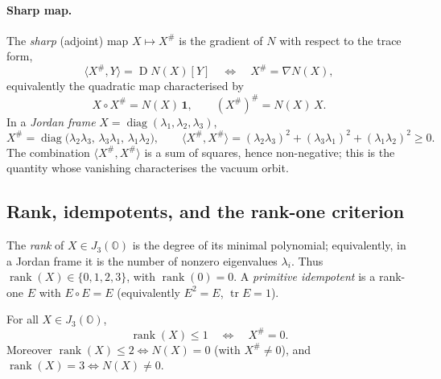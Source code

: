 \paragraph{Sharp map.}
The \emph{sharp} (adjoint) map $X\mapsto X^{\#}$ is the gradient of $N$
with respect to the trace form,
\begin{equation}\label{eq:albert:sharpdef}
  \langle X^{\#}, Y\rangle = \operatorname{D}N(X)[Y]
  \quad\Longleftrightarrow\quad
  X^{\#}=\nabla N(X),
\end{equation}
equivalently the quadratic map characterised by
\begin{equation}\label{eq:albert:sharpid}
  X\circ X^{\#}=N(X)\,\mathbf 1,
  \qquad
  (X^{\#})^{\#}=N(X)\,X .
\end{equation}
In a \emph{Jordan frame} $X=\operatorname{diag}(\lambda_{1},\lambda_{2},\lambda_{3})$,
\begin{equation}\label{eq:albert:sharpframe}
  X^{\#}=\operatorname{diag}\!\bigl(\lambda_{2}\lambda_{3},\,
  \lambda_{3}\lambda_{1},\,\lambda_{1}\lambda_{2}\bigr),
  \qquad
  \langle X^{\#},X^{\#}\rangle
  =(\lambda_{2}\lambda_{3})^{2}+(\lambda_{3}\lambda_{1})^{2}+(\lambda_{1}\lambda_{2})^{2}\ge 0 .
\end{equation}
The combination $\langle X^{\#},X^{\#}\rangle$ is a sum of squares,
hence non-negative; this is the quantity whose vanishing characterises
the vacuum orbit.

\subsection{Rank, idempotents, and the rank-one criterion}
\label{sec:albert:rank}

\begin{definition}[Rank]\label{def:albert:rank}
The \emph{rank} of $X\in J_{3}(\mathbb{O})$ is the degree of its minimal
polynomial; equivalently, in a Jordan frame it is the number of nonzero
eigenvalues $\lambda_{i}$. Thus $\operatorname{rank}(X)\in\{0,1,2,3\}$,
with $\operatorname{rank}(0)=0$. A \emph{primitive idempotent} is a
rank-one $E$ with $E\circ E=E$ (equivalently $E^{2}=E$, $\operatorname{tr}E=1$).
\end{definition}

\begin{theorem}\label{thm:albert:rankone}
For all $X\in J_{3}(\mathbb{O})$,
\begin{equation}\label{eq:albert:rankone}
  \operatorname{rank}(X)\le 1
  \quad\Longleftrightarrow\quad
  X^{\#}=0 .
\end{equation}
Moreover $\operatorname{rank}(X)\le 2\Leftrightarrow N(X)=0$ (with
$X^{\#}\neq 0$), and $\operatorname{rank}(X)=3\Leftrightarrow N(X)\neq 0$.
\end{theorem}

